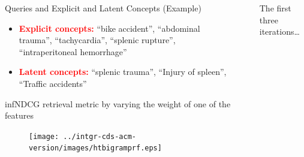 \documentclass[final]{beamer}
\newlength{\sepwid}
\newlength{\onecolwid}
\newlength{\twocolwid}
\begin{document}
\begin{frame}[t]
\begin{columns}[t]
\begin{column}{\onecolwid}
\begin{block}{Queries and Explicit and Latent Concepts (Example)}
\begin{itemize}
\item  \textcolor{red}{\textbf{Explicit concepts:}} ``bike accident'', ``abdominal trauma'', ``tachycardia'', ``splenic rupture'', ``intraperitoneal hemorrhage''

\item  \textcolor{red}{\textbf{Latent concepts:}}
  ``splenic trauma'', ``Injury of spleen'', ``Traffic accidents''


\end{itemize}
\end{block}



\begin{block}{infNDCG retrieval metric by varying the weight of one of the features}
  \begin{figure}[!htb]
  \centering
  \texttt{[image: ../intgr-cds-acm-version/images/htbigramprf.eps]}
  \end{figure}

\end{block}





\end{column} %

\begin{column}{\sepwid}\end{column} %

\begin{column}{\twocolwid} %


\begin{alertblock}{The first three iterations\ldots}
  \begin{figure}[!htb]
  \centering
  \end{figure}
\end{alertblock}


\end{column}
\end{columns}
\end{frame}
\end{document}
